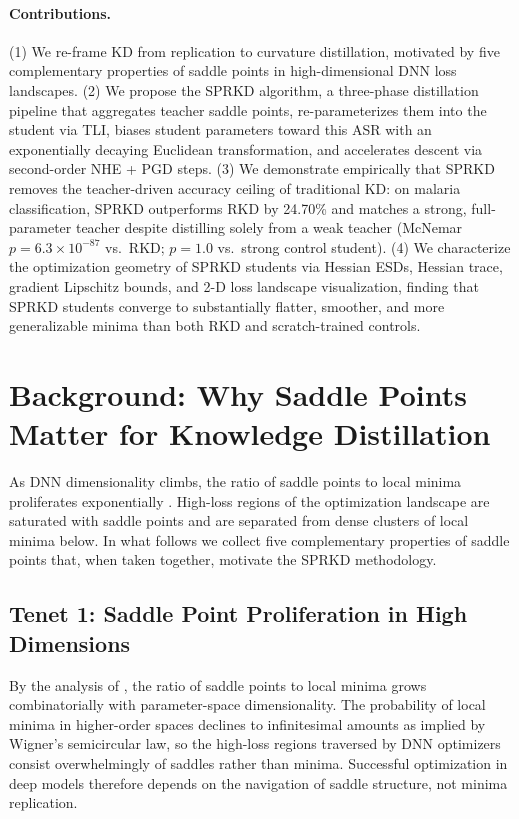 \documentclass[letterpaper]{article}
\begin{document}
\paragraph{Contributions.} (1) We re-frame KD from replication to curvature distillation, motivated by five complementary properties of saddle points in high-dimensional DNN loss landscapes. (2) We propose the SPRKD algorithm, a three-phase distillation pipeline that aggregates teacher saddle points, re-parameterizes them into the student via TLI, biases student parameters toward this ASR with an exponentially decaying Euclidean transformation, and accelerates descent via second-order NHE + PGD steps. (3) We demonstrate empirically that SPRKD removes the teacher-driven accuracy ceiling of traditional KD: on malaria classification, SPRKD outperforms RKD by 24.70\% and matches a strong, full-parameter teacher despite distilling solely from a weak teacher (McNemar $p = 6.3 \times 10^{-87}$ vs.~RKD; $p = 1.0$ vs.~strong control student). (4) We characterize the optimization geometry of SPRKD students via Hessian ESDs, Hessian trace, gradient Lipschitz bounds, and 2-D loss landscape visualization, finding that SPRKD students converge to substantially flatter, smoother, and more generalizable minima than both RKD and scratch-trained controls.

\section{Background: Why Saddle Points Matter for Knowledge Distillation}
\label{sec:five-tenets}

As DNN dimensionality climbs, the ratio of saddle points to local minima proliferates exponentially \citep{dauphin2014identifying}. High-loss regions of the optimization landscape are saturated with saddle points and are separated from dense clusters of local minima below. In what follows we collect five complementary properties of saddle points that, when taken together, motivate the SPRKD methodology.

\subsection{Tenet 1: Saddle Point Proliferation in High Dimensions}
By the analysis of \citet{dauphin2014identifying}, the ratio of saddle points to local minima grows combinatorially with parameter-space dimensionality. The probability of local minima in higher-order spaces declines to infinitesimal amounts as implied by Wigner's semicircular law, so the high-loss regions traversed by DNN optimizers consist overwhelmingly of saddles rather than minima. Successful optimization in deep models therefore depends on the navigation of saddle structure, not minima replication.
\end{document}
